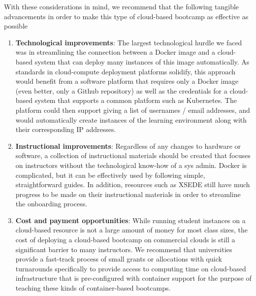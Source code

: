 With these considerations in mind, we recommend that the following tangible
advancements in order to make this type of cloud-based bootcamp as effective
as possible

\begin{enumerate}

\item {\bf Technological improvements}: The largest technological hurdle we
faced was in streamlining the connection between a Docker image and a
cloud-based system that can deploy many instances of this image automatically.
As standards in cloud-compute deployment platforms solidify, this approach would
benefit from a software platform that requires only a Docker image (even better,
only a Github repository) as well as the credentials for a cloud-based system
that supports a common platform such as Kubernetes. The platform could then
support giving a list of usernames / email addresses, and would automatically
create instances of the learning environment along with their corresponding IP
addresses.

\item {\bf Instructional improvements}: Regardless of any changes to hardware
or software, a collection of instructional materials should be created that
focuses on instructors without the technological know-how of a sys admin.
Docker is complicated, but it can be effectively used by following simple,
straightforward guides. In addition, resources such as XSEDE still have
much progress to be made on their instructional materials in order to
streamline the onboarding process.

\item {\bf Cost and payment opportunities}: While running student instances on a
cloud-based resource is not a large amount of money for most class sizes, the
cost of deploying a cloud-based bootcamp on commercial clouds is still a
significant barrier to many instructors. We recommend that universities provide
a fast-track process of small grants or allocations with quick turnarounds
specifically to provide access to computing time on cloud-based infrastructure
that is pre-configured with container support for the purpose of teaching
these kinds of container-based bootcamps.

\end{enumerate}
